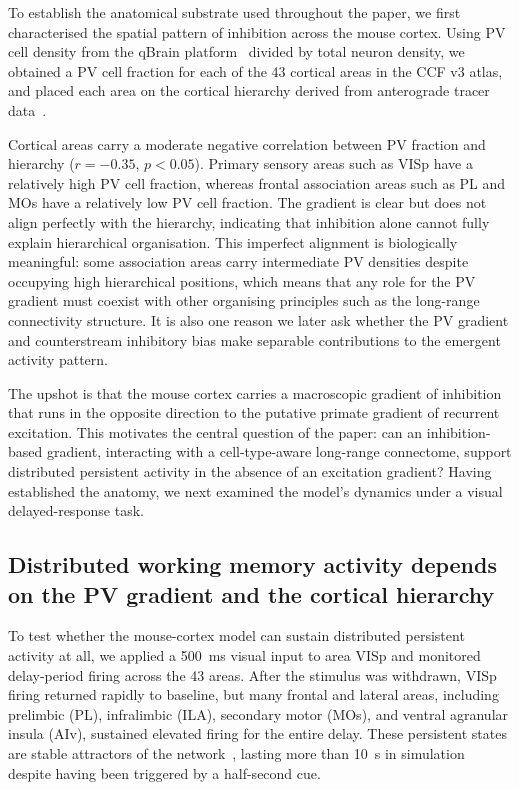 \documentclass[11pt]{article}
\begin{document}
To establish the anatomical substrate used throughout the paper, we first characterised the spatial pattern of inhibition across the mouse cortex. Using PV cell density from the qBrain platform~\cite{kim2017braintype} divided by total neuron density, we obtained a PV cell fraction for each of the 43 cortical areas in the CCF v3 atlas, and placed each area on the cortical hierarchy derived from anterograde tracer data~\cite{oh2014mesoscale,harris2019hierarchical}.

Cortical areas carry a moderate negative correlation between PV fraction and hierarchy ($r=-0.35$, $p<0.05$). Primary sensory areas such as VISp have a relatively high PV cell fraction, whereas frontal association areas such as PL and MOs have a relatively low PV cell fraction. The gradient is clear but does not align perfectly with the hierarchy, indicating that inhibition alone cannot fully explain hierarchical organisation. This imperfect alignment is biologically meaningful: some association areas carry intermediate PV densities despite occupying high hierarchical positions, which means that any role for the PV gradient must coexist with other organising principles such as the long-range connectivity structure. It is also one reason we later ask whether the PV gradient and counterstream inhibitory bias make separable contributions to the emergent activity pattern.

The upshot is that the mouse cortex carries a macroscopic gradient of inhibition that runs in the opposite direction to the putative primate gradient of recurrent excitation. This motivates the central question of the paper: can an inhibition-based gradient, interacting with a cell-type-aware long-range connectome, support distributed persistent activity in the absence of an excitation gradient? Having established the anatomy, we next examined the model's dynamics under a visual delayed-response task.

\subsection{Distributed working memory activity depends on the PV gradient and the cortical hierarchy}

To test whether the mouse-cortex model can sustain distributed persistent activity at all, we applied a 500~ms visual input to area VISp and monitored delay-period firing across the 43 areas. After the stimulus was withdrawn, VISp firing returned rapidly to baseline, but many frontal and lateral areas, including prelimbic (PL), infralimbic (ILA), secondary motor (MOs), and ventral agranular insula (AIv), sustained elevated firing for the entire delay. These persistent states are stable attractors of the network~\cite{inagaki2019discrete}, lasting more than 10~s in simulation despite having been triggered by a half-second cue.
\end{document}
